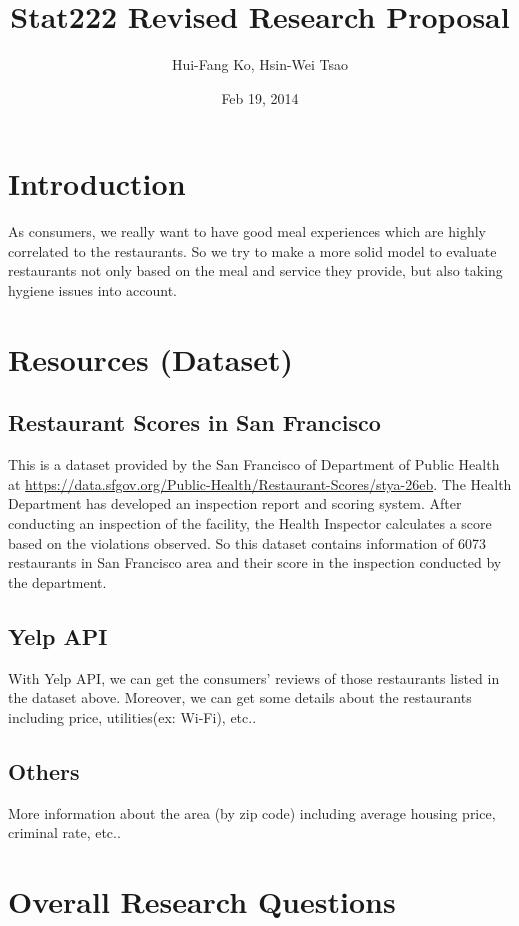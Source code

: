 \documentclass{article}
\title{Stat222 Revised Research Proposal}
\author{Hui-Fang Ko, Hsin-Wei Tsao}
\date{Feb 19, 2014}
\begin{document}
\maketitle

\section{Introduction}
As consumers, we really want to have good meal experiences which are highly correlated to the restaurants. So we try to make a more solid model to evaluate restaurants not only based on the meal and service they provide, but also taking hygiene issues into account.



\section{Resources (Dataset)}
\subsection{Restaurant Scores in San Francisco}
This is a dataset provided by the San Francisco of Department of Public Health at \url{https://data.sfgov.org/Public-Health/Restaurant-Scores/stya-26eb}. The Health Department has developed an inspection report and scoring system. After conducting an inspection of the facility, the Health Inspector calculates a score based on the violations observed. So this dataset contains information of 6073 restaurants in San Francisco area and their score in the inspection conducted by the department.

\subsection{Yelp API}
With Yelp API, we can get the consumers' reviews of those restaurants listed in the dataset above. Moreover, we can get some details about the restaurants including price, utilities(ex: Wi-Fi), etc.. 

\subsection{Others}
More information about the area (by zip code) including average housing price, criminal rate, etc..

\section{Overall Research Questions}
\end{document}
